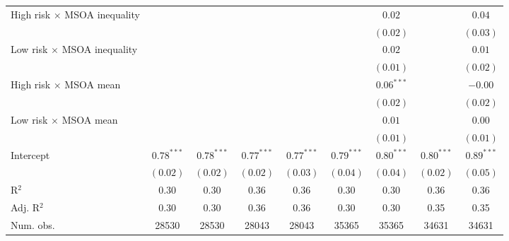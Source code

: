 \documentclass[12pt, letter]{scrartcl}
\begin{document}
\begin{table}[t]
{\begin{tabular}{l c c c c c c c c}
High risk $\times$ MSOA inequality          &               &               &               &               &               & $0.02$        &               & $0.04$        \\
                                            &               &               &               &               &               & $(0.02)$      &               & $(0.03)$      \\
Low risk $\times$ MSOA inequality           &               &               &               &               &               & $0.02$        &               & $0.01$        \\
                                            &               &               &               &               &               & $(0.01)$      &               & $(0.02)$      \\
High risk $\times$ MSOA mean                &               &               &               &               &               & $0.06^{***}$  &               & $-0.00$       \\
                                            &               &               &               &               &               & $(0.02)$      &               & $(0.02)$      \\
Low risk $\times$ MSOA mean                 &               &               &               &               &               & $0.01$        &               & $0.00$        \\
                                            &               &               &               &               &               & $(0.01)$      &               & $(0.01)$      \\
Intercept                                   & $0.78^{***}$  & $0.78^{***}$  & $0.77^{***}$  & $0.77^{***}$  & $0.79^{***}$  & $0.80^{***}$  & $0.80^{***}$  & $0.89^{***}$  \\
                                            & $(0.02)$      & $(0.02)$      & $(0.02)$      & $(0.03)$      & $(0.04)$      & $(0.04)$      & $(0.02)$      & $(0.05)$      \\
\hline
R$^2$                                       & 0.30          & 0.30          & 0.36          & 0.36          & 0.30          & 0.30          & 0.36          & 0.36          \\
Adj. R$^2$                                  & 0.30          & 0.30          & 0.36          & 0.36          & 0.30          & 0.30          & 0.35          & 0.35          \\
Num. obs.                                   & 28530         & 28530         & 28043         & 28043         & 35365         & 35365         & 34631         & 34631         \\

\end{tabular}}
\end{table}
\end{document}
